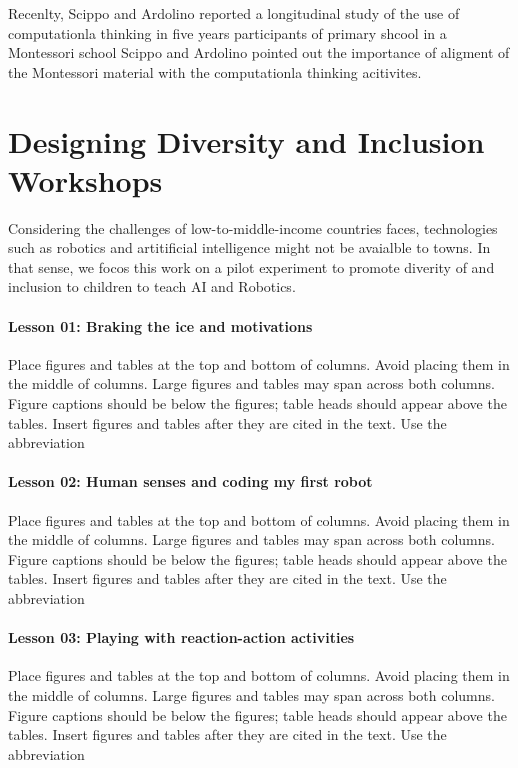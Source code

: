 \documentclass[conference]{IEEEtran}
\begin{document}
Recenlty, Scippo and Ardolino reported a longitudinal study of the use of computationla thinking in five years participants of primary shcool in a Montessori school \cite{ScippoArdolino2021}
Scippo and Ardolino pointed out the importance of aligment of the Montessori material with the computationla thinking acitivites. 

\section{Designing Diversity and Inclusion Workshops}
Considering the challenges of low-to-middle-income countries faces, technologies such as robotics and artitificial intelligence might not be avaialble to towns. 
In that sense, we focos this work on a pilot experiment to promote diverity of and inclusion to children to teach AI and Robotics. 

\paragraph{Lesson 01: Braking the ice and motivations} 
Place figures and tables at the top and bottom of columns. Avoid placing them in the middle of columns. 
Large figures and tables may span across both columns. Figure captions should be below the figures; table heads should appear above the tables. 
Insert figures and tables after they are cited in the text. Use the abbreviation 

\paragraph{Lesson 02: Human senses and coding my first robot} 
Place figures and tables at the top and bottom of columns. Avoid placing them in the middle of columns. 
Large figures and tables may span across both columns. Figure captions should be below the figures; table heads should appear above the tables. 
Insert figures and tables after they are cited in the text. Use the abbreviation 

\paragraph{Lesson 03: Playing with reaction-action activities} 
Place figures and tables at the top and bottom of columns. Avoid placing them in the middle of columns. 
Large figures and tables may span across both columns. Figure captions should be below the figures; table heads should appear above the tables. 
Insert figures and tables after they are cited in the text. Use the abbreviation 
\end{document}
